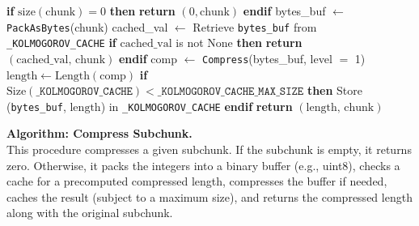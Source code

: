 \documentclass{article}
\theoremstyle{remark}
\begin{document}
\begin{algorithm}[H]
\caption{Compress Subchunk}
\begin{algorithmic}[1]
    \State \textbf{if} $\mathrm{size}(\mathrm{chunk}) = 0$ \textbf{then}
        \State \quad \textbf{return} $(0, \mathrm{chunk})$
    \State \textbf{endif}
    \State bytes\_buf $\gets$ \texttt{PackAsBytes}(chunk) 
    \State cached\_val $\gets$ Retrieve \texttt{bytes\_buf} from \texttt{\_KOLMOGOROV\_CACHE}
    \State \textbf{if} $\mathrm{cached\_val}$ is not $\mathrm{None}$ \textbf{then}
        \State \quad \textbf{return} $(\mathrm{cached\_val},\, \mathrm{chunk})$
    \State \textbf{endif}
    \State comp $\gets$ \texttt{Compress}(bytes\_buf, level $=$ 1)
    \State $\mathrm{length} \gets \mathrm{Length}(\mathrm{comp})$
    \State \textbf{if} $\mathrm{Size}(\texttt{\_KOLMOGOROV\_CACHE}) < \texttt{\_KOLMOGOROV\_CACHE\_MAX\_SIZE}$ \textbf{then}
        \State \quad Store (\texttt{bytes\_buf}, $\mathrm{length}$) in \texttt{\_KOLMOGOROV\_CACHE}
    \State \textbf{endif}
    \State \textbf{return} $(\mathrm{length},\, \mathrm{chunk})$
\EndProcedure
\end{algorithmic}
\end{algorithm}

\noindent
\textbf{Algorithm: Compress Subchunk.}\\
This procedure compresses a given subchunk. If the subchunk is empty, it returns zero. Otherwise, it packs the integers into a binary buffer (e.g., uint8), checks a cache for a precomputed compressed length, compresses the buffer if needed, caches the result (subject to a maximum size), and returns the compressed length along with the original subchunk.

\vspace{1em}
\end{document}
